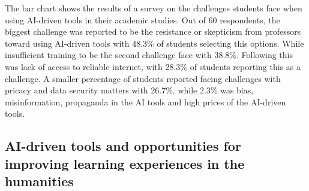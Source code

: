 
\begin{figure}[H]
	\centering
\end{figure}
The bar chart shows the results of a survey on the challenges students
face when using AI-driven tools in their academic studies. Out of 60 respondents,
the biggest challenge was reported to be the resistance or skepticism from professors
toward using AI-driven tools with 48.3\% of students selecting this options.
While insufficient training to be the second challenge
face with 38.8\%.
Following this was lack of access to reliable internet, with 28.3\% of students
reporting this as a challenge.
A smaller percentage of students reported facing challenges with pricacy and data security matters
with 26.7\%. while 2.3\% was bias, misinformation, propaganda in the AI tools and high prices of the AI-driven tools.

\subsection{AI-driven tools and opportunities for improving learning experiences in the humanities }

